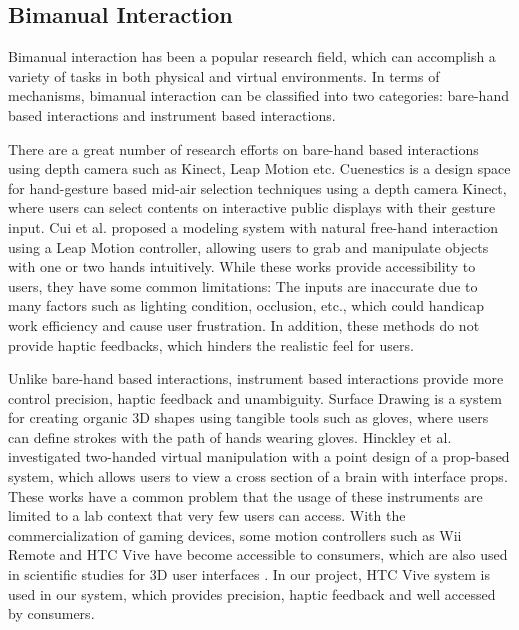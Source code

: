 \documentclass{svjour3}                     %
\begin{document}
\subsection{Bimanual Interaction}
\label{sec:2.1}
Bimanual interaction has been a popular research field, which can accomplish a variety of tasks in both physical and virtual environments.
In terms of mechanisms, bimanual interaction can be classified into two categories: bare-hand based interactions and instrument based interactions.

There are a great number of research efforts \cite{walter2014cuenesics,cui2016exploration,ramani2015gesture,murugappan2013handy,han2014virtual} on bare-hand based interactions using depth camera such as Kinect, Leap Motion etc.
Cuenestics \cite{walter2014cuenesics} is a design space for hand-gesture based mid-air selection techniques using a depth camera Kinect, where users can select contents on interactive public displays with their gesture input.
Cui et al. \cite{cui2016exploration} proposed a modeling system with natural free-hand interaction using a Leap Motion controller, allowing users to grab and manipulate objects with one or two hands intuitively.
While these works provide accessibility to users, they have some common limitations: The inputs are inaccurate due to many factors such as lighting condition, occlusion, etc., which could handicap work efficiency and cause user frustration.
In addition, these methods do not provide haptic feedbacks, which hinders the realistic feel for users.

Unlike bare-hand based interactions, instrument based interactions provide more control precision, haptic feedback and unambiguity.
Surface Drawing \cite{schkolne2001surface} is a system for creating organic 3D shapes using tangible tools such as gloves, where users can define strokes with the path of hands wearing gloves.
Hinckley et al. \cite{hinckley1998two} investigated two-handed virtual manipulation with a point design of a prop-based system, which allows users to view a cross section of a brain with interface props.
These works have a common problem that the usage of these instruments are limited to a lab context that very few users can access.
%
With the commercialization of gaming devices, some motion controllers such as Wii Remote and HTC Vive have become accessible to consumers, which are also used in scientific studies for 3D user interfaces \cite{wingcrave2010wii,niehorster2017accuracy}.
%
In our project, HTC Vive system is used in our system, which provides precision, haptic feedback and well accessed by consumers.
\end{document}
